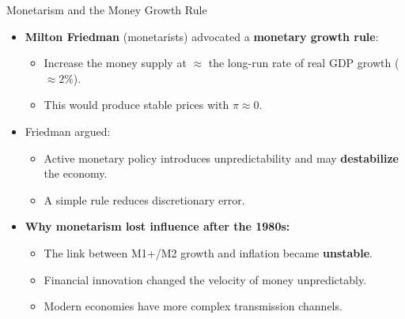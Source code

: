 \documentclass[aspectratio=169]{beamer}
\begin{document}
\begin{frame}{Monetarism and the Money Growth Rule}
\transfade
\begin{itemize}[<+->]
  \item \textbf{Milton Friedman} (monetarists) advocated a \textbf{monetary growth rule}:
  \begin{itemize}[<+->]
    \item Increase the money supply at $\approx$ the long-run rate of real GDP growth ($\approx 2\%$).
    \item This would produce stable prices with $\pi \approx 0$.
  \end{itemize}
  \item Friedman argued:
  \begin{itemize}[<+->]
    \item Active monetary policy introduces unpredictability and may \textbf{destabilize} the economy.
    \item A simple rule reduces discretionary error.
  \end{itemize}
  \item \textbf{Why monetarism lost influence after the 1980s:}
  \begin{itemize}[<+->]
    \item The link between M1+/M2 growth and inflation became \textbf{unstable}.
    \item Financial innovation changed the velocity of money unpredictably.
    \item Modern economies have more complex transmission channels.
  \end{itemize}
\end{itemize}
\end{frame}
\end{document}

